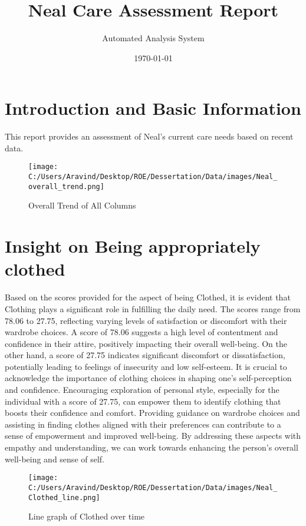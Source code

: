 \documentclass[10pt, a4paper]{article}%
\title{Neal Care Assessment Report}%
\author{Automated Analysis System}%
\date{\today}%
\begin{document}
%
\normalsize%
\maketitle%
\section{Introduction and Basic Information}%
\label{sec:IntroductionandBasicInformation}%
This report provides an assessment of Neal's current care needs based on recent data.%


\begin{figure}[H]%
\centering%
\texttt{[image: C:/Users/Aravind/Desktop/ROE/Dessertation/Data/images/Neal\_overall\_trend.png]}%
\caption{Overall Trend of All Columns}%
\end{figure}

%
\section{Insight on Being appropriately clothed}%
\label{sec:InsightonBeingappropriatelyclothed}%
Based on the scores provided for the aspect of being Clothed, it is evident that Clothing plays a significant role in fulfilling the daily need. The scores range from 78.06 to 27.75, reflecting varying levels of satisfaction or discomfort with their wardrobe choices. A score of 78.06 suggests a high level of contentment and confidence in their attire, positively impacting their overall well{-}being. On the other hand, a score of 27.75 indicates significant discomfort or dissatisfaction, potentially leading to feelings of insecurity and low self{-}esteem.\newline%
\newline%
It is crucial to acknowledge the importance of clothing choices in shaping one's self{-}perception and confidence. Encouraging exploration of personal style, especially for the individual with a score of 27.75, can empower them to identify clothing that boosts their confidence and comfort. Providing guidance on wardrobe choices and assisting in finding clothes aligned with their preferences can contribute to a sense of empowerment and improved well{-}being.\newline%
\newline%
By addressing these aspects with empathy and understanding, we can work towards enhancing the person's overall well{-}being and sense of self.%


\begin{figure}[H]%
\centering%
\texttt{[image: C:/Users/Aravind/Desktop/ROE/Dessertation/Data/images/Neal\_Clothed\_line.png]}%
\caption{Line graph of Clothed over time}%
\end{figure}
\end{document}
